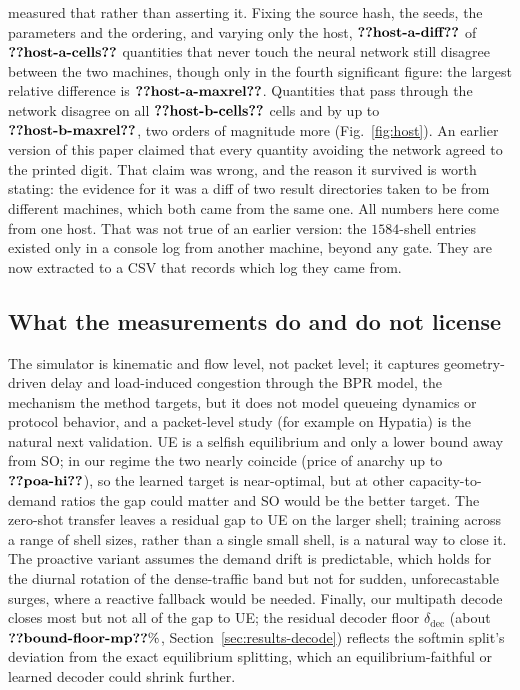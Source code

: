 \documentclass[journal]{IEEEtran}
\begin{document}
measured that rather than asserting it. Fixing the source hash, the seeds, the parameters and the
ordering, and varying only the host, $\clm{host-a-diff}$ of $\clm{host-a-cells}$ quantities that
never touch the neural network still disagree between the two machines, though only in the fourth
significant figure: the largest relative difference is $\clm{host-a-maxrel}$. Quantities that pass
through the network disagree on all $\clm{host-b-cells}$ cells and by up to
$\clm{host-b-maxrel}$, two orders of magnitude more (Fig.~\ref{fig:host}). An earlier version of this paper claimed that
every quantity avoiding the network agreed to the printed digit. That claim was wrong, and the
reason it survived is worth stating: the evidence for it was a diff of two result directories
taken to be from different machines, which both came from the same one. All
numbers here come from one host. That was not true of an earlier version: the $1584$-shell entries existed only in a console log from another machine, beyond any gate. They are now extracted to a CSV that records which log they came from.



\subsection{What the measurements do and do not license}
The simulator is kinematic and flow level, not packet level; it captures
geometry-driven delay and load-induced congestion through the BPR model, the mechanism
the method targets, but it does not model queueing dynamics or protocol behavior, and a
packet-level study (for example on Hypatia) is the natural next validation. UE is a
selfish equilibrium and only a lower bound away from SO; in our regime the two nearly
coincide (price of anarchy up to $\clm{poa-hi}$), so the learned target is near-optimal, but at
other capacity-to-demand ratios the gap could matter and SO would be the better target.
The zero-shot transfer leaves a residual gap to UE on the larger shell; training across
a range of shell sizes, rather than a single small shell, is a natural way to close it.
The proactive variant assumes the demand drift is predictable, which holds for the
diurnal rotation of the dense-traffic band but not for sudden, unforecastable surges,
where a reactive fallback would be needed. Finally, our multipath decode closes most but
not all of the gap to UE; the residual decoder floor $\delta_{\mathrm{dec}}$ (about $\clm{bound-floor-mp}\%$,
Section~\ref{sec:results-decode}) reflects the softmin split's deviation from the exact
equilibrium splitting, which an equilibrium-faithful or learned decoder could shrink
further.
\end{document}
